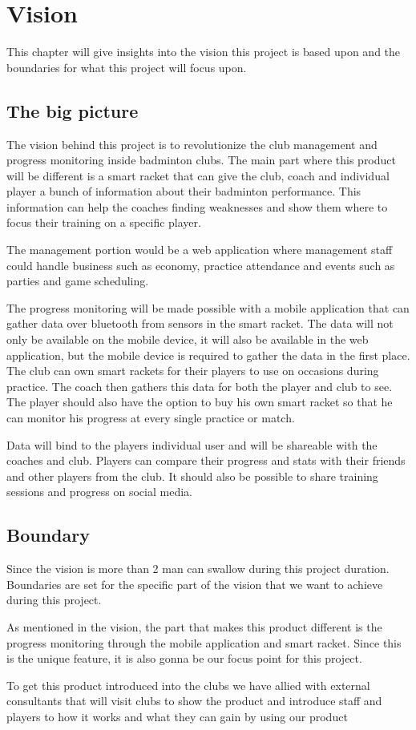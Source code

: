 \chapter{Vision}
This chapter will give insights into the vision this project is based upon and the boundaries for what this project will focus upon.


\section*{The big picture}

The vision behind this project is to revolutionize the club management and progress monitoring inside badminton clubs. The main part where this product will be different is a smart racket that can give the club, coach and individual player a bunch of information about their badminton performance. This information can help the coaches finding weaknesses and show them where to focus their training on a specific player. 

The management portion would be a web application where management staff could handle business such as economy, practice attendance and events such as parties and game scheduling.

The progress monitoring will be made possible with a mobile application that can gather data over bluetooth from sensors in the smart racket. The data will not only be available on the mobile device, it will also be available in the web application, but the mobile device is required to gather the data in the first place. The club can own smart rackets for their players to use on occasions during practice. The coach then gathers this data for both the player and club to see. The player should also have the option to buy his own smart racket so that he can monitor his progress at every single practice or match.

Data will bind to the players individual user and will be shareable with the coaches and club. Players can compare their progress and stats with their friends and other players from the club. It should also be possible to share training sessions and progress on social media.


\section*{Boundary}
Since the vision is more than 2 man can swallow during this project duration. Boundaries are set for the specific part of the vision that we want to achieve during this project.

As mentioned in the vision, the part that makes this product different is the progress monitoring through the mobile application and smart racket. Since this is the unique feature, it is also gonna be our focus point for this project.

To get this product introduced into the clubs we have allied with external consultants that will visit clubs to show the product and introduce staff and players to how it works and what they can gain by using our product

